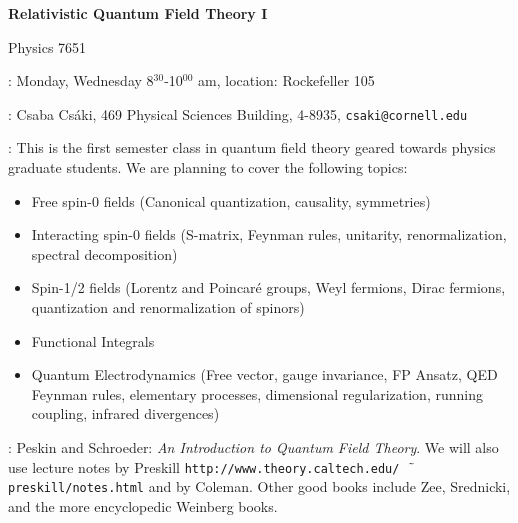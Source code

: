 \textwidth 6.5in \oddsidemargin 0in \evensidemargin 0in \textheight
8.6in \topmargin -0.5in \pagestyle{empty}


\vspace*{-1cm}
\begin{center}
{\LARGE \bf Relativistic Quantum Field Theory I}

\vspace*{0.5cm} {\Large Physics 7651}

\vspace*{0.5cm}
\end{center}
:  Monday, Wednesday 8$^{30}$-10$^{00}$ am,
location: Rockefeller 105 \vspace*{0.5cm}

: Csaba Cs\'aki, 469 Physical Sciences Building, 4-8935,
{\tt csaki@cornell.edu} \vspace*{0.5cm}

: This is the first semester class in quantum field theory geared towards physics graduate students.  We are planning to cover the following topics:

\begin{itemize}\addtolength{\itemsep}{-0.5\baselineskip}
\item Free spin-0 fields (Canonical quantization, causality, symmetries)
\item Interacting spin-0 fields (S-matrix, Feynman rules, unitarity, renormalization, spectral decomposition)
\item Spin-1/2 fields (Lorentz and Poincar\'e groups, Weyl fermions, Dirac fermions, quantization and renormalization of spinors) 
\item Functional Integrals 
\item Quantum Electrodynamics (Free vector, gauge invariance, FP Ansatz, QED Feynman rules, elementary processes, dimensional regularization, running coupling, infrared divergences) 
\end{itemize}
 

:  Peskin  and Schroeder: \textit{An Introduction to Quantum Field Theory}. We will also use lecture notes by Preskill 
{\tt http://www.theory.caltech.edu/ $\tilde{\hspace*{0.2cm}}$preskill/notes.html} and by Coleman.  Other good books include Zee, Srednicki, and the more encyclopedic Weinberg books. 

 \vspace*{0.5cm}


